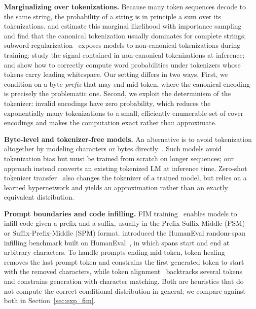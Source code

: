 \documentclass{article} %
\begin{document}
\textbf{Marginalizing over tokenizations.}
Because many token sequences decode to the same string, the probability of a string is in principle a sum over its tokenizations. \citet{cao2021marginal} and \citet{chirkova2023marginalize} estimate this marginal likelihood with importance sampling and find that the canonical tokenization usually dominates for complete strings; subword regularization~\citep{kudo2018subword,provilkov2020bpedropout} exposes models to non-canonical tokenizations during training; \citet{geh2024signal} study the signal contained in non-canonical tokenizations at inference; and \citet{pimentel2024word} show how to correctly compute word probabilities under tokenizers whose tokens carry leading whitespace. Our setting differs in two ways. First, we condition on a byte \emph{prefix} that may end mid-token, where the canonical encoding is precisely the problematic one. Second, we exploit the determinism of the tokenizer: invalid encodings have zero probability, which reduces the exponentially many tokenizations to a small, efficiently enumerable set of cover encodings and makes the computation exact rather than approximate.

\textbf{Byte-level and tokenizer-free models.}
An alternative is to avoid tokenization altogether by modeling characters or bytes directly~\citep{alrfou2019character,xue2022byt5,clark2022canine,tay2022charformer,yu2023megabyte,wang2024mambabyte}. Such models avoid tokenization bias but must be trained from scratch on longer sequences; our approach instead converts an existing tokenized LM at inference time. Zero-shot tokenizer transfer~\citep{minixhofer2024zett} also changes the tokenizer of a trained model, but relies on a learned hypernetwork and yields an approximation rather than an exactly equivalent distribution.

\textbf{Prompt boundaries and code infilling.}
FIM training~\citep{bavarian2022fim,fried2023incoder,roziere2023codellama} enables models to infill code given a prefix and a suffix, usually in the Prefix-Suffix-Middle (PSM) or Suffix-Prefix-Middle (SPM) format. \citet{bavarian2022fim} introduced the HumanEval random-span infilling benchmark built on HumanEval~\citep{chen2021codex}, in which spans start and end at arbitrary characters. To handle prompts ending mid-token, token healing~\citep{dagan2024tokenizer} removes the last prompt token and constrains the first generated token to start with the removed characters, while token alignment~\citep{athiwaratkun2024alignment} backtracks several tokens and constrains generation with character matching. Both are heuristics that do not compute the correct conditional distribution in general; we compare against both in Section~\ref{sec:exp_fim}.
\end{document}
